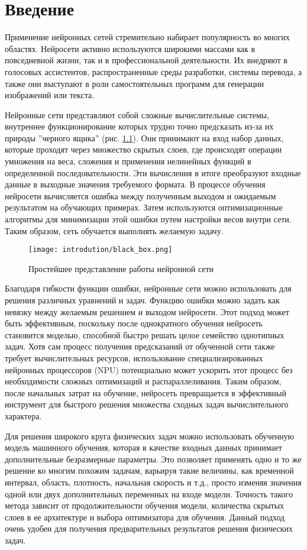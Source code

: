 \chapter{Введение}

Применение нейронных сетей стремительно набирает популярность во многих областях.
Нейросети активно используются широкими массами как в повседневной жизни, так и в
профессиональной деятельности. Их внедряют в голосовых ассистентов, распространенные
среды разработки, системы перевода, а также они выступают в роли самостоятельных
программ для генерации изображений или текста.

Нейронные сети представляют собой сложные вычислительные системы, внутреннее
функционирование которых трудно точно предсказать из-за их природы ''черного ящика''
(рис. \ref{fig:black_box}). Они принимают на вход набор данных, которые
проходят через множество скрытых слоев, где происходят операции умножения на веса,
сложения и применения нелинейных функций в определенной последовательности.
Эти вычисления в итоге преобразуют входные данные в выходные значения требуемого
формата. В процессе обучения нейросети вычисляется ошибка между полученным выходом
и ожидаемым результатом на обучающих примерах. Затем используются оптимизационные 
алгоритмы для минимизации этой ошибки путем настройки весов внутри сети. 
Таким образом, сеть обучается выполнять желаемую задачу.

\begin{figure}[h]
    \texttt{[image: introdution/black\_box.png]}
    \caption{Простейшее представление работы нейронной сети}
    \label{fig:black_box}
\end{figure}

Благодаря гибкости функции ошибки, нейронные сети можно использовать для решения
различных уравнений и задач. Функцию ошибки можно задать как невязку между желаемым
решением и выходом нейросети. Этот подход может быть эффективным, поскольку после
однократного обучения нейросеть становится моделью, способной быстро решать целое
семейство однотипных задач. Хотя сам процесс получения предсказаний от обученной
сети также требует вычислительных ресурсов, использование специализированных нейронных
процессоров (NPU) потенциально может ускорить этот процесс без необходимости сложных
оптимизаций и распараллеливания. Таким образом, после начальных затрат на обучение,
нейросеть превращается в эффективный инструмент для быстрого решения множества сходных
задач вычислительного характера.

Для решения широкого круга физических задач можно использовать обученную модель машинного
обучения, которая в качестве входных данных принимает дополнительные безразмерные параметры.
Это позволяет применять одно и то же решение ко многим похожим задачам, варьируя такие
величины, как временной интервал, область, плотность, начальная скорость и т.д., просто
изменяя значения одной или двух дополнительных переменных на входе модели. Точность такого
метода зависит от продолжительности обучения модели, количества скрытых слоев в ее архитектуре
и выбора оптимизатора для обучения. Данный подход очень удобен для получения предварительных
результатов решения физических задач.